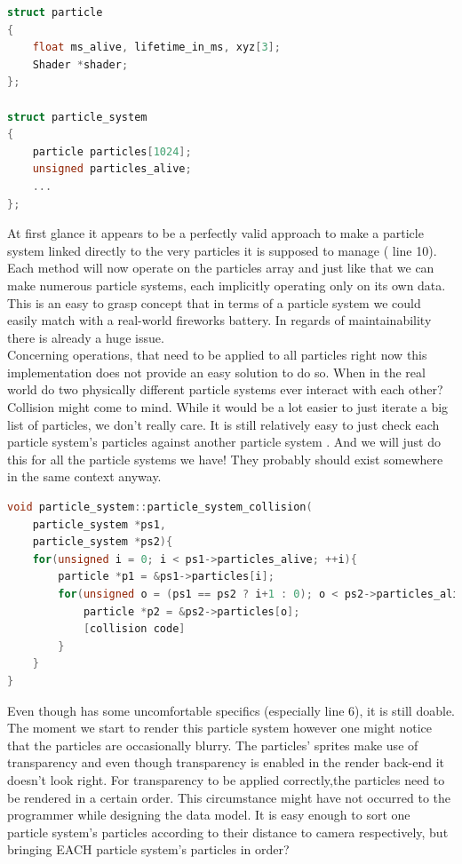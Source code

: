  \begin{lstlisting}[language=C++,name={ OOP typical, simplified particle system implementation},label={particle_system}]
struct particle
{
	float ms_alive, lifetime_in_ms, xyz[3];
	Shader *shader;
};

struct particle_system
{
	particle particles[1024];
	unsigned particles_alive;
	...
};
\end{lstlisting}
At first glance it appears to be a perfectly valid approach to make a particle system linked directly to the very particles it is supposed to manage ( line 10). Each method will now operate on the particles array and just like that we can make numerous particle systems, each implicitly operating only on its own data. This is an easy to grasp concept that in terms of a particle system we could easily match with a real-world fireworks battery. In regards of maintainability there is already a huge issue.\\
Concerning operations, that need to be applied to all particles right now this implementation does not provide an easy solution to do so. When in the real world do two physically different particle systems ever interact with each other? Collision might come to mind. While it would be a lot easier to just iterate a big list of particles, we don't really care. It is still relatively easy to just check each particle system's particles against another particle system . And we will just do this for all the particle systems we have! They probably should exist somewhere in the same context anyway.\\
 \begin{lstlisting}[language=C++,name={Example code how OOP could handle collision between different particle systems' particles},label={collision}]
void particle_system::particle_system_collision(
	particle_system *ps1,
	particle_system *ps2){
	for(unsigned i = 0; i < ps1->particles_alive; ++i){
		particle *p1 = &ps1->particles[i];
		for(unsigned o = (ps1 == ps2 ? i+1 : 0); o < ps2->particles_alive; ++o){
			particle *p2 = &ps2->particles[o];
			[collision code]
		}
	}
}
\end{lstlisting}
Even though  has some uncomfortable specifics (especially line 6), it is still doable. The moment we start to render this particle system however one might notice that the particles are occasionally blurry. The particles' sprites make use of transparency and even though transparency is enabled in the render back-end it doesn't look right. For transparency to be applied correctly,the particles need to be rendered in a certain order. This circumstance might have not occurred to the programmer while designing the data model. It is easy enough to sort one particle system's particles according to their distance to camera respectively, but bringing EACH particle system's particles in order?\\
